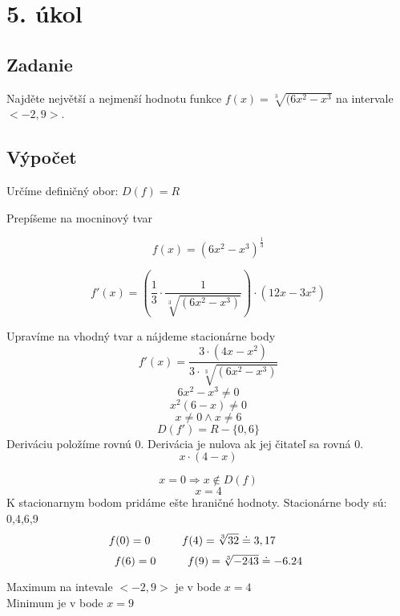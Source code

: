 \section{5. úkol}
\subsection{Zadanie}
 Najděte největší a nejmenší hodnotu funkce $f(x)=\sqrt[3]{(6x^2-x^3} $ na intervale $ <-2,9>$.
\subsection{Výpočet}
Určíme definičný obor: $D(f)=R$

Prepíšeme na mocninový tvar

\begin{displaymath}
f(x)=(6x^2-x^3)^\frac{1}{3}
\end{displaymath}

\begin{displaymath}
f'(x)=\left(\frac{1}{3}\cdot\frac{1}{\sqrt[3]{(6x^2-x^3)}}\right)\cdot(12x-3x^2)
\end{displaymath}

Upravíme na vhodný tvar a nájdeme stacionárne body
\begin{displaymath}
f'(x)=\frac{3\cdot(4x-x^2)}{3\cdot\sqrt[3]{(6x^2-x^3)}}
\end{displaymath}
\begin{displaymath}
6x^2-x^3\neq0
\end{displaymath}
\begin{displaymath}
x^2(6-x)\neq0
\end{displaymath}
\begin{displaymath}
x\neq0 \wedge  x\neq6
\end{displaymath}
\begin{displaymath}
D(f')=R-\{0,6\}
\end{displaymath}
Deriváciu položíme rovnú 0. Derivácia je nulova ak jej čitateľ sa rovná 0.
\begin{displaymath}
x\cdot(4-x)
\end{displaymath}

\begin{displaymath}
x=0 \Rightarrow x\notin D(f)
\end{displaymath}
\begin{displaymath}
x=4
\end{displaymath}
K stacionarnym bodom pridáme ešte hraničné hodnoty. 
Stacionárne body sú: 0,4,6,9 
\begin{displaymath}
f(0)=0 \hspace{10mm} f(4)=\sqrt[3]{32}\doteq 3,17 \hspace{10mm}
\end{displaymath}
\begin{displaymath}
f(6)=0 \hspace{10mm} f(9)=\sqrt[3]{-243}\doteq -6.24
\end{displaymath}
\begin{center}
\large{Maximum na intevale $ <-2,9>$ je v bode $x=4$ \\
 Minimum je v bode $x=9$}
\end{center}
